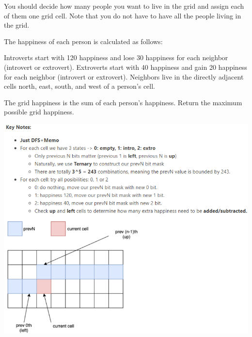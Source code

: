 \documentclass[9pt, b5paaper]{book}
\begin{document}
You should decide how many people you want to live in the grid and assign each of them one grid cell. Note that you do not have to have all the people living in the grid.

The happiness of each person is calculated as follows:

Introverts start with 120 happiness and lose 30 happiness for each neighbor (introvert or extrovert).
Extroverts start with 40 happiness and gain 20 happiness for each neighbor (introvert or extrovert).
Neighbors live in the directly adjacent cells north, east, south, and west of a person's cell.

The grid happiness is the sum of each person's happiness. Return the maximum possible grid happiness.

\includegraphics[width=.9\linewidth]{./pic/happiness.png} 
\end{document}

